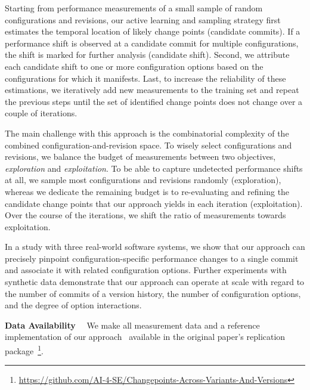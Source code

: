 \documentclass[utf8,biblatex]{lni}
\begin{document}
Starting from performance measurements of a small sample of random configurations and revisions, our active learning and sampling strategy first estimates the temporal location of likely change points (candidate commits). If a performance shift is observed at a candidate commit for multiple configurations, the shift is marked for further analysis (candidate shift). Second, we attribute each candidate shift to one or more configuration options based on the configurations for which it manifests. Last, to increase the reliability of these estimations, we iteratively add new measurements to the training set and repeat the previous steps until the set of identified change points does not change over a couple of iterations.

The main challenge with this approach is the combinatorial complexity of the combined configuration-and-revision space. To wisely select configurations and revisions, we balance the budget of measurements between two objectives, \textit{exploration} and \textit{exploitation}. To be able to capture undetected performance shifts at all, we sample most configurations and revisions randomly ({exploration}), whereas we dedicate the remaining budget is to re-evaluating and refining the candidate change points that our approach yields in each iteration ({exploitation}). %
Over the course of the iterations, we shift the ratio of measurements towards exploitation. 


In a study with three real-world software systems, we show that our approach can precisely pinpoint configuration-specific performance changes to a single commit and associate it with related configuration options. Further experiments with synthetic data demonstrate that our approach can operate at scale with regard to the number of commits of a version history, the number of configuration options, and the degree of option interactions.

\textbf{Data Availability}~~
We make all measurement data and a reference implementation of our approach~\cite{muehlbauer_identifying_2020} available in the original paper's replication package~\footnote{\url{https://github.com/AI-4-SE/Changepoints-Across-Variants-And-Versions}}.

\printbibliography
\end{document}

